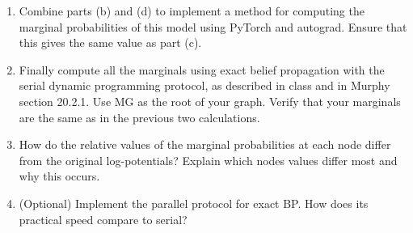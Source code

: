 \documentclass[submit]{harvardml}
\theoremstyle{plain}
\begin{document}
\begin{problem}[30pts]
\begin{enumerate}[label=(\alph*)]
\item Combine parts (b) and (d) to implement a method for computing
  the marginal probabilities of this model using PyTorch and
  autograd. Ensure that this gives the same value as part (c).

\item Finally compute all the marginals using exact belief propagation
  with the serial dynamic programming protocol, as described in class
  and in Murphy section 20.2.1. Use MG as the root of your graph.
  Verify that your marginals are the same as in the previous two
  calculations.

\item How do the relative values of the marginal probabilities at each
  node differ from the original log-potentials?  Explain which nodes
  values differ most and why this occurs.


\item (Optional) Implement the parallel protocol for exact BP. How does its practical speed compare to
  serial?
\end{enumerate}
\end{problem}
\end{document}
